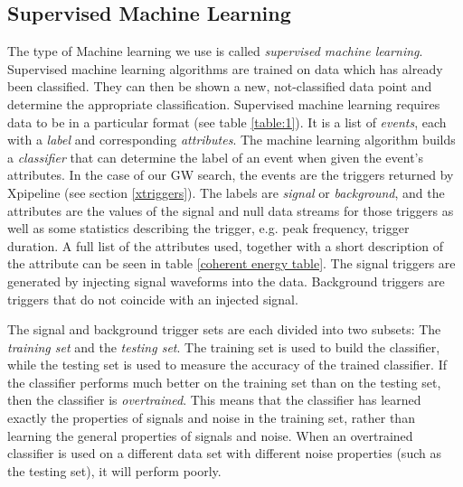 \documentclass[12pt,twoside,a4paper]{report}
\begin{document}
\subsection{Supervised Machine Learning}
The type of Machine learning we use is called \textit{supervised machine learning}. Supervised machine learning algorithms are trained on data which has already been classified. They can then be shown a new, not-classified data point and determine the appropriate classification. Supervised machine learning requires data to be in a particular format (see table \ref{table:1}). It is a list of \emph{events}, each with a \emph{label} and corresponding \emph{attributes}. The machine learning algorithm builds a \textit{classifier} that can determine the label of an event when given the event's attributes. In the case of our GW search, the events are the triggers returned by Xpipeline (see section \ref{xtriggers}). The labels are \textit{signal} or \textit{background}, and the attributes are the values of the signal and null data streams for those triggers as well as some statistics describing the trigger, e.g. peak frequency, trigger duration. A full list of the attributes used, together with a short description of the attribute can be seen in table \ref{coherent energy table}. The signal triggers are generated by injecting signal waveforms into the data. Background triggers are triggers that do not coincide with an injected signal.


The signal and background trigger sets are each divided into two subsets: The \emph{training set} and the \emph{testing set}. The training set is used to build the classifier, while the testing set is used to measure the accuracy of the trained classifier. If the classifier performs much better on the training set than on the testing set, then the classifier is \emph{overtrained}. This means that the classifier has learned exactly the properties of signals and noise in the training set, rather than learning the general properties of signals and noise. When an overtrained classifier is used on a different data set with different noise properties (such as the testing set), it will perform poorly. 
\end{document}
